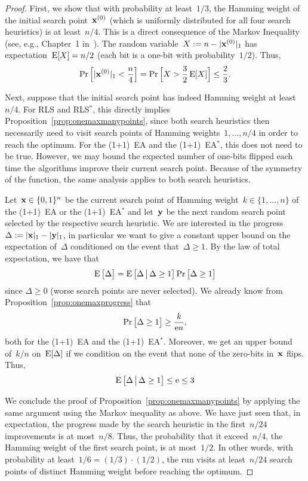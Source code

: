 \documentclass[a4paper,11pt]{article}
\begin{document}
\begin{proof}
First, we show that with probability at least~$1/3$, the Hamming weight of the initial search point~$\xvec[0]$ (which is uniformly distributed for all four search heuristics) is at least~$n/4$. This is a direct consequence of the Markov Inequality (see, e.g., Chapter~1 in~\cite{DoerrA11}). The random variable~$X:=n-\ham{\xvec[0]}$ has expectation~$\operatorname{E}[X]=n/2$ (each bit is a one-bit with probability~$1/2$). Thus,
\[
\Pr\Big[\ham{\xvec[0]}< \frac{n}{4}\Big]=\Pr\Big[X>\frac{3}{2}\EXP[X]\Big]\le\frac{2}{3}.
\]

Next, suppose that the initial search point has indeed Hamming weight at least~$n/4$. For RLS and RLS$^*$, this directly implies Proposition~\ref{prop:onemaxmanypoints}, since both search heuristics then necessarily need to visit search points of Hamming weights~$1,\dots,n/4$ in order to reach the optimum. For the (1+1)~EA and the (1+1)~EA$^*$, this does not need to be true. However, we may bound the expected number of one-bits flipped each time the algorithms improve their current search point. Because of the symmetry of the \onemax function, the same analysis applies to both search heuristics.

Let~$\xvec\in\{0,1\}^n$ be the current search point of Hamming weight~$k\in\{1,\dots,n\}$ of the (1+1)~EA or the (1+1)~EA$^*$ and let~$\yvec$ be the next random search point selected by the respective search heuristic. We are interested in the progress~$\Delta:=\ham{\xvec}-\ham{\yvec}$, in particular we want to give a constant upper bound on the expectation of~$\Delta$ conditioned on the event that~$\Delta\ge 1$. By the law of total expectation, we have that
\[
\operatorname{E}\big[\Delta\big]=\operatorname{E}\big[\Delta\,\big|\,\Delta\ge 1\big]\Pr\big[\Delta\ge 1\big]
\]
since $\Delta\ge 0$ (worse search points are never selected). We already know from Proposition~\ref{prop:onemaxprogress} that
\[
\Pr\big[\Delta\ge 1\big]\ge\frac{k}{\mathrm{e} n},
\] 
both for the (1+1)~EA and the (1+1)~EA$^*$. Moreover, we get an upper bound of~$k/n$ on~$\operatorname{E}[\Delta]$ if we condition on the event that none of the zero-bits in~$\xvec$ flips. Thus,
\[
\operatorname{E}\big[\Delta\,\big|\,\Delta\ge 1\big]\le\mathrm{e}\le 3
\]

We conclude the proof of Proposition~\ref{prop:onemaxmanypoints} by applying the same argument using the Markov inequality as above. We have just seen that, in expectation, the progress made by the search heuristic in the first~$n/24$ improvements is at most~$n/8$. Thus, the probability that it exceed~$n/4$, the Hamming weight of the first search point, is at most~$1/2$. In other words, with probability at least~$1/6=(1/3)\cdot(1/2)$, the run visits at least~$n/24$ search points of distinct Hamming weight before reaching the optimum. 
\end{proof}
\end{document}
